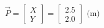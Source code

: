 \documentclass[preview]{standalone}
\begin{document}
\begin{align*}
\vec{P} = \begin{bmatrix} X \\ Y \end{bmatrix}= \begin{bmatrix} 2.5 \\ 2.0 \end{bmatrix} \text{ (m)}
\end{align*}
\end{document}
